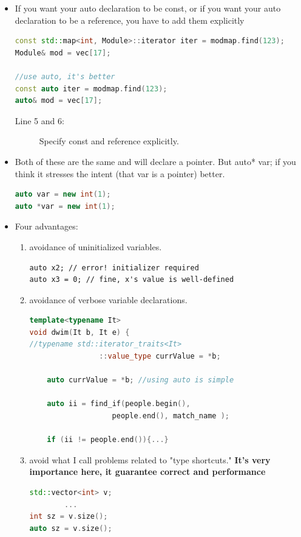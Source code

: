 \documentclass[a4paper,11pt,twoside]{book}
\begin{document}
\begin{itemize}
	\item If you want your auto declaration to be const, or if you want your auto declaration to be a reference, you have to add them explicitly
	
\begin{lstlisting}[frame=single, language=c++]
const std::map<int, Module>::iterator iter = modmap.find(123);
Module& mod = vec[17];

//use auto, it's better
const auto iter = modmap.find(123);
auto& mod = vec[17];
\end{lstlisting}
\begin{description}
	\item[Line 5 and 6:] Specify const and reference explicitly.
\end{description}
	
	\item Both of these are the same and will declare a pointer. But auto* var; if you think it stresses the intent (that var is a pointer) better.
\begin{lstlisting}[frame=single, language=c++]
auto var = new int(1);
auto *var = new int(1);
\end{lstlisting}


	\item Four advantages:
	\begin{enumerate}
		\item avoidance of uninitialized variables.
\begin{lstlisting}[numbers=none]
auto x2; // error! initializer required
auto x3 = 0; // fine, x's value is well-defined
\end{lstlisting}

		\item avoidance of verbose variable declarations.
\begin{lstlisting}[frame=single, language=c++]
template<typename It>
void dwim(It b, It e) {
//typename std::iterator_traits<It>
                ::value_type currValue = *b;
                
	auto currValue = *b; //using auto is simple
	
	auto ii = find_if(people.begin(), 
	               people.end(), match_name );
	               
	if (ii != people.end()){...}
\end{lstlisting}

		\item avoid what I call problems related to "type shortcuts." \textbf{It's very importance here, it guarantee correct and performance}
\begin{lstlisting}[frame=single, language=c++]
std::vector<int> v;
		...
int sz = v.size();
auto sz = v.size();
		

\end{lstlisting}
\end{enumerate}
\end{itemize}
\end{document}
